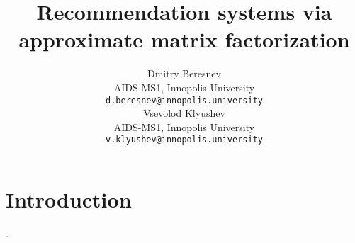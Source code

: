 \documentclass{article}
\title{Recommendation systems via approximate matrix factorization}
\date{} 					%
\author{
  \hspace{1mm}Dmitry Beresnev \\
	AIDS-MS1, Innopolis University\\
	\texttt{d.beresnev@innopolis.university} \\
	\And{}
  \hspace{1mm}Vsevolod Klyushev \\
	AIDS-MS1, Innopolis University\\
	\texttt{v.klyushev@innopolis.university}
}
\begin{document}
\maketitle


\section{Introduction}
\ldots
\end{document}
